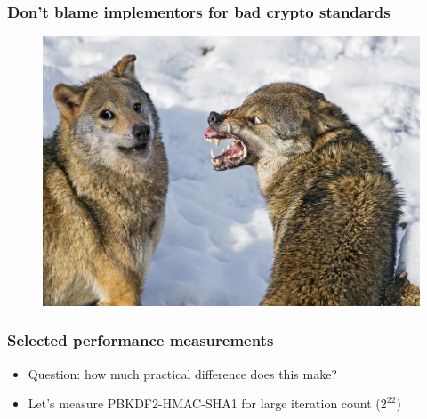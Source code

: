 \documentclass[aspectratio=169]{beamer}
\begin{document}
\frame
{
  \frametitle{Don't blame implementors for bad crypto standards}

  \begin{figure}
  \centering
  \includegraphics[width=.9\textwidth]{imgs/wolf-doge.jpg}
  \end{figure}
}

\frame
{
  \frametitle{Selected performance measurements}

  \begin{itemize}
    \item<1> Question: how much practical difference does this make?
    \item<2> Let's measure PBKDF2-HMAC-SHA1 for large iteration count ($2^{22}$)
  \end{itemize}

}
\note{}
\end{document}
